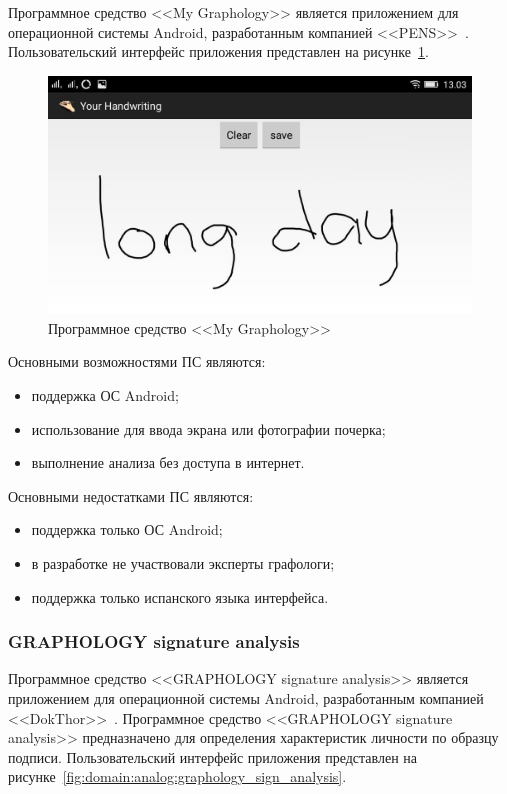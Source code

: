 Программное средство <<My Graphology>> является приложением для операционной системы Android, разработанным компанией <<PENS>>~\cite{analogs_my_graphology}. Пользовательский интерфейс приложения представлен на рисунке~\ref{fig:domain:analogs:my_graphology}.

\begin{figure}[h]
    \centering
    \includegraphics[width=0.4\textheight]{figures/analog_my_graphology.jpeg}
    \caption{Программное средство <<My Graphology>>}
    \label{fig:domain:analogs:my_graphology}
\end{figure}

Основными возможностями ПС являются:
\begin{itemize}
  \item поддержка ОС Android;
  \item использование для ввода экрана или фотографии почерка;
  \item выполнение анализа без доступа в интернет.
\end{itemize}

Основными недостатками ПС являются:
\begin{itemize}
  \item поддержка только ОС Android;
  \item в разработке не участвовали эксперты графологи;
  \item поддержка только испанского языка интерфейса.
\end{itemize}

\subsubsection{GRAPHOLOGY signature analysis}
\label{sub:domain:analogs:graphology_sign_analysis}

Программное средство <<GRAPHOLOGY signature analysis>> является приложением для операционной системы Android, разработанным компанией <<DokThor>>~\cite{analogs_graphology_sign_analysis}. Программное средство <<GRAPHOLOGY signature analysis>> предназначено для определения характеристик личности по образцу подписи. Пользовательский интерфейс приложения представлен на рисунке~\ref{fig:domain:analog:graphology_sign_analysis}.

